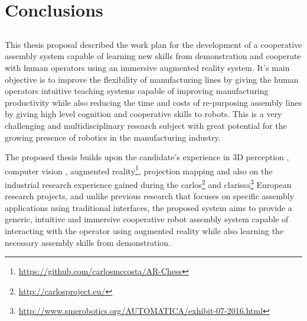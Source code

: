 \chapter{Conclusions}\label{chap:conclusions-and-future-work}



\section*{}

This thesis proposal described the work plan for the development of a cooperative assembly system capable of learning new skills from demonstration and cooperate with human operators using an immersive augmented reality system. It's main objective is to improve the flexibility of manufacturing lines by giving the human operators intuitive teaching systems capable of improving manufacturing productivity while also reducing the time and costs of re-purposing assembly lines by giving high level cognition and cooperative skills to robots. This is a very challenging and multidisciplinary research subject with great potential for the growing presence of robotics in the manufacturing industry.

The proposed thesis builds upon the candidate's experience in 3D perception \cite{Costa2015Diss,Costa2015ICIT,Costa2015Intech,Costa2016Elsevier}, computer vision \cite{Costa2014,Costa2016ICARSC}, augmented reality\footnote{\url{https://github.com/carlosmccosta/AR-Chess}}, projection mapping and also on the industrial research experience gained during the \gls{carlos}\footnote{\url{http://carlosproject.eu/}} and \gls{clarissa}\footnote{\url{http://www.smerobotics.org/AUTOMATICA/exhibit-07-2016.html}} European research projects, and unlike previous research that focuses on specific assembly applications using traditional interfaces, the proposed system aims to provide a generic, intuitive and immersive cooperative robot assembly system capable of interacting with the operator using augmented reality while also learning the necessary assembly skills from demonstration.